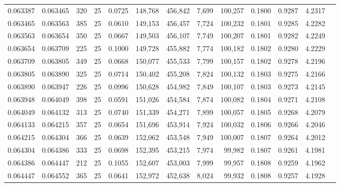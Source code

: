 \begin{tabular}{rrrrrrrrrrrrr}
0.063387 & 0.063465 &   320 &  25 &                                     0.0725 & 148,768 & 456,842 &   7,699 & 100,257 & 0.1800 & 0.9287 & 4.2317 \\
0.063465 & 0.063563 &   385 &  25 &                                     0.0610 & 149,153 & 456,457 &   7,724 & 100,232 & 0.1801 & 0.9285 & 4.2282 \\
0.063563 & 0.063654 &   350 &  25 &                                     0.0667 & 149,503 & 456,107 &   7,749 & 100,207 & 0.1801 & 0.9282 & 4.2249 \\
0.063654 & 0.063709 &   225 &  25 &                                     0.1000 & 149,728 & 455,882 &   7,774 & 100,182 & 0.1802 & 0.9280 & 4.2229 \\
0.063709 & 0.063805 &   349 &  25 &                                     0.0668 & 150,077 & 455,533 &   7,799 & 100,157 & 0.1802 & 0.9278 & 4.2196 \\
0.063805 & 0.063890 &   325 &  25 &                                     0.0714 & 150,402 & 455,208 &   7,824 & 100,132 & 0.1803 & 0.9275 & 4.2166 \\
0.063890 & 0.063947 &   226 &  25 &                                     0.0996 & 150,628 & 454,982 &   7,849 & 100,107 & 0.1803 & 0.9273 & 4.2145 \\
0.063948 & 0.064049 &   398 &  25 &                                     0.0591 & 151,026 & 454,584 &   7,874 & 100,082 & 0.1804 & 0.9271 & 4.2108 \\
0.064049 & 0.064132 &   313 &  25 &                                     0.0740 & 151,339 & 454,271 &   7,899 & 100,057 & 0.1805 & 0.9268 & 4.2079 \\
0.064133 & 0.064215 &   357 &  25 &                                     0.0654 & 151,696 & 453,914 &   7,924 & 100,032 & 0.1806 & 0.9266 & 4.2046 \\
0.064215 & 0.064304 &   366 &  25 &                                     0.0639 & 152,062 & 453,548 &   7,949 & 100,007 & 0.1807 & 0.9264 & 4.2012 \\
0.064304 & 0.064386 &   333 &  25 &                                     0.0698 & 152,395 & 453,215 &   7,974 &  99,982 & 0.1807 & 0.9261 & 4.1981 \\
0.064386 & 0.064447 &   212 &  25 &                                     0.1055 & 152,607 & 453,003 &   7,999 &  99,957 & 0.1808 & 0.9259 & 4.1962 \\
0.064447 & 0.064552 &   365 &  25 &                                     0.0641 & 152,972 & 452,638 &   8,024 &  99,932 & 0.1808 & 0.9257 & 4.1928 \\

\end{tabular}
